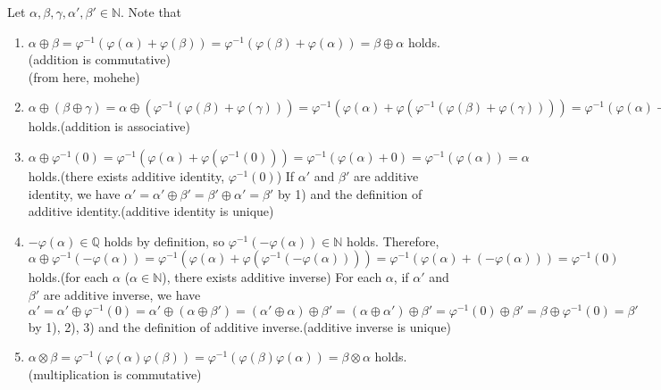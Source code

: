 \documentclass{article}
\begin{document}
\begin{enumerate}[label = (\alph*)]
	Let $\alpha,\beta,\gamma,\alpha',\beta'\in\mathbb{N}$.
	Note that
\begin{enumerate}[label = \alph*)]
         \item $\alpha \oplus \beta = \varphi^{-1} (\varphi(\alpha) + \varphi(\beta)) = \varphi^{-1} (\varphi(\beta) + \varphi(\alpha)) = \beta \oplus \alpha$ holds.(addition is commutative)\\
         {\color{red}(from here, mohehe)}
         \item $\alpha \oplus (\beta \oplus \gamma) = \alpha \oplus (\varphi^{-1}(\varphi(\beta) + \varphi(\gamma))) = \varphi^{-1}(\varphi(\alpha) + \varphi(\varphi^{-1}(\varphi(\beta) + \varphi(\gamma))))  = \varphi^{-1}(\varphi(\alpha) + (\varphi(\beta) + \varphi(\gamma))) = \varphi^{-1}((\varphi(\alpha) + \varphi(\beta)) + \varphi(\gamma)) = \varphi^{-1}(\varphi(\varphi^{-1}(\varphi(\alpha) + \varphi(\beta))) + \varphi(\gamma)) = \varphi^{-1}(\varphi(\alpha) + \varphi(\beta)) \oplus \gamma = (\alpha \oplus \beta) \oplus \gamma$ holds.(addition is associative)
         \item $\alpha \oplus \varphi^{-1}(0) = \varphi^{-1}(\varphi(\alpha) + \varphi(\varphi^{-1}(0))) = \varphi^{-1}(\varphi(\alpha) + 0) = \varphi^{-1}(\varphi(\alpha)) = \alpha$ holds.(there exists additive identity, $\varphi^{-1}(0)$)
  If $\alpha'$ and $\beta'$ are additive identity, we have $\alpha' = \alpha' \oplus \beta' = \beta' \oplus \alpha' = \beta'$ by 1) and the definition of additive identity.(additive identity is unique)
         \item $-\varphi(\alpha)\in\mathbb{Q}$ holds by definition, so $\varphi^{-1}(-\varphi(\alpha)) \in \mathbb{N}$ holds. 
   Therefore, $\alpha \oplus \varphi^{-1}(-\varphi(\alpha)) = \varphi^{-1}(\varphi(\alpha) + \varphi(\varphi^{-1}(-\varphi(\alpha)))) = \varphi^{-1}(\varphi(\alpha) +  (-\varphi(\alpha))) = \varphi^{-1}(0)$ holds.(for each $\alpha$ ($\alpha\in\mathbb{N}$), there exists additive inverse)
  For each $\alpha$, if $\alpha'$ and $\beta'$ are additive inverse, we have $\alpha' = \alpha' \oplus \varphi^{-1}(0) = \alpha' \oplus (\alpha \oplus \beta') = (\alpha' \oplus \alpha) \oplus \beta' = (\alpha \oplus \alpha') \oplus \beta' = \varphi^{-1}(0) \oplus \beta' = \beta \oplus \varphi^{-1}(0) = \beta'$ by 1), 2), 3) and the definition of additive inverse.(additive inverse is unique)
         \item $\alpha \otimes \beta = \varphi^{-1}(\varphi(\alpha)\varphi(\beta)) = \varphi^{-1}(\varphi(\beta)\varphi(\alpha)) = \beta \otimes \alpha$ holds.(multiplication is commutative)

\end{enumerate}
\end{enumerate}
\end{document}
